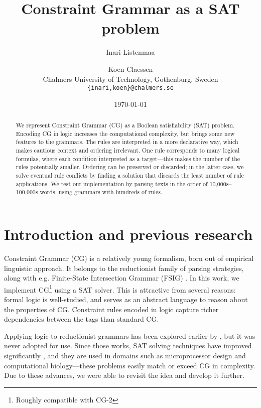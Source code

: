 \documentclass[11pt]{article}
\title{Constraint Grammar as a SAT problem}
\author{Inari Listenmaa \and Koen Claessen \\
 Chalmers University of Technology, Gothenburg, Sweden \\
 {\tt \{inari,koen\}@chalmers.se} }
\date{\today}
\begin{document}
\maketitle

\begin{abstract} 

We represent Constraint Grammar (CG) as a Boolean satisfiability (SAT) problem.
Encoding CG in logic increases the computational complexity, 
but brings some new features to the grammars.
The rules are interpreted in a more declarative way, which makes
cautious context and ordering irrelevant.
One rule corresponds to many logical formulas,
where each condition interpreted as a target---this makes the number of the rules
potentially smaller. 
Ordering can be preserved or discarded;
in the latter case, we solve eventual rule conflicts by finding a
solution that discards the least number of rule applications.
We test our implementation by parsing texts in the order of
10,000s--100,000s words, using grammars with hundreds of rules.
\end{abstract}


\section{Introduction and previous research}

Constraint Grammar (CG) \cite{karlsson1995constraint} is a relatively
young formalism, born out of empirical linguistic approach. 
It belongs to the reductionist family of parsing
strategies, along with e.g. Finite-State Intersection Grammar (FSIG) \cite{koskenniemi90}.
In this work, we implement CG\footnote{Roughly compatible with CG-2}
using a SAT solver. This is attractive from several reasons: formal logic is
well-studied, and serves as an abstract language to reason about the
properties of CG. Constraint rules encoded in logic capture richer
dependencies between the tags than standard CG.

Applying logic to reductionist grammars has been explored earlier by \cite{lager98,lager_nivre01}, but it was never adopted for use.
Since those works, SAT solving techniques have improved significantly \cite{marques_silva2010}, and they are used in domains such as microprocessor design and computational 
biology---these problems easily match or exceed CG in complexity. 
Due to these advances, we were able to revisit the idea and develop it
further. 
\end{document}
